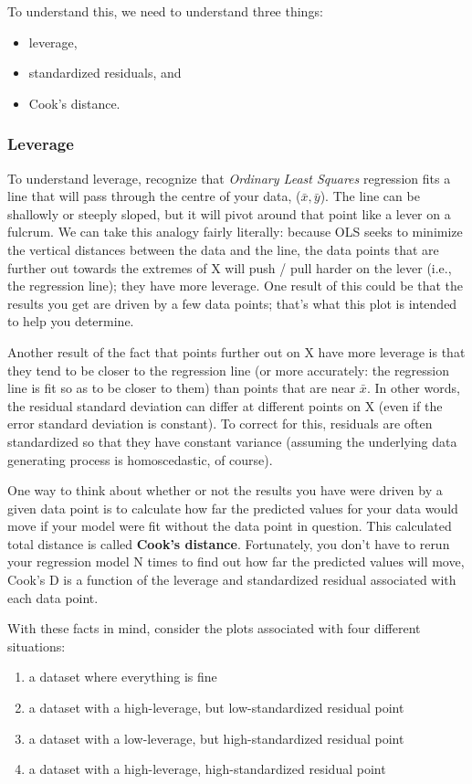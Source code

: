 To understand this, we need to understand three things:

\begin{itemize}
\item leverage,
\item standardized residuals, and
\item Cook's distance.
\end{itemize}
\subsubsection{Leverage}
To understand leverage, recognize that \textit{Ordinary Least Squares} regression fits a line that will pass through the centre of your data, ($\bar{x}, \bar{y}$). The line can be shallowly or steeply sloped, but it will pivot around that point like a lever on a fulcrum. We can take this analogy fairly literally: because OLS seeks to minimize the vertical distances between the data and the line, the data points that are further out towards the extremes of X will push / pull harder on the lever (i.e., the regression line); they have more leverage. One result of this could be that the results you get are driven by a few data points; that's what this plot is intended to help you determine.

Another result of the fact that points further out on X have more leverage is that they tend to be closer to the regression line (or more accurately: the regression line is fit so as to be closer to them) than points that are near $\bar{x}$. In other words, the residual standard deviation can differ at different points on X (even if the error standard deviation is constant). To correct for this, residuals are often standardized so that they have constant variance (assuming the underlying data generating process is homoscedastic, of course).

One way to think about whether or not the results you have were driven by a given data point is to calculate how far the predicted values for your data would move if your model were fit without the data point in question. This calculated total distance is called \textbf{Cook's distance}. Fortunately, you don't have to rerun your regression model N times to find out how far the predicted values will move, Cook's D is a function of the leverage and standardized residual associated with each data point.

With these facts in mind, consider the plots associated with four different situations:
\begin{enumerate}
\item a dataset where everything is fine
\item a dataset with a high-leverage, but low-standardized residual point
\item a dataset with a low-leverage, but high-standardized residual point
\item a dataset with a high-leverage, high-standardized residual point
\end{enumerate}


